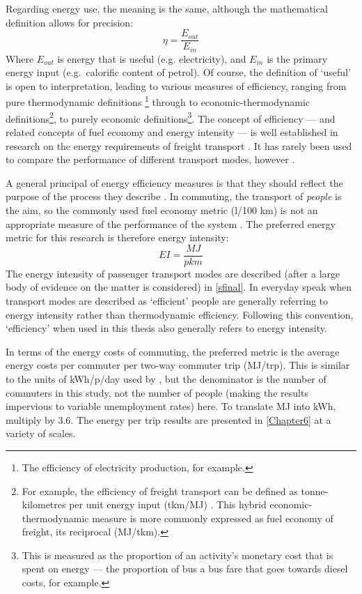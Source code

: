 \begin{itemize}
Regarding energy use, the meaning is the same, although the mathematical
definition allows for precision:
\begin{equation}
 \eta = \frac{E_{out}}{E_{in}}
\end{equation}
Where $E_{out}$ is energy that is useful (e.g. electricity), and $E_{in}$ is
the primary energy input (e.g.\ calorific content of petrol). Of course, the
definition of `useful' is open to interpretation\citep{Patterson1996}, leading
to various measures of efficiency, ranging from pure thermodynamic definitions
\footnote{The efficiency of electricity production, for example.}
through to
economic-thermodynamic definitions\footnote{For example, the efficiency of
freight transport can be defined as tonne-kilometres per unit energy input
(tkm/MJ) \citep{Simongati2010}. This hybrid economic-thermodynamic measure is
more commonly expressed as fuel economy of freight, its reciprocal
(MJ/tkm).},
to purely economic definitions\footnote{This is measured as the proportion of
an activity's monetary cost that is spent on energy --- the proportion of bus a
bus fare that goes towards diesel costs, for example.}. The concept of
efficiency --- and related concepts of fuel economy and energy
intensity --- is well established in research on the energy requirements
of freight transport \citep{Kamakate2009}. It has rarely been used to compare
the performance of different transport modes, however \citep{Fels1975,
Lovelace2011-assessing}.

A general principal of energy efficiency measures is that they should reflect
the purpose of the process they describe \citep{Patterson1996}. In commuting,
the transport of \emph{people} is the aim, so the commonly used fuel economy
metric (l/100 km) is not an appropriate measure of the  performance of the
system \citep{MacKay2009}. The preferred energy metric for this research is
therefore energy intensity:
\begin{equation}
 EI = \frac{MJ}{pkm}
\end{equation}
The energy intensity of passenger transport modes are described
(after a large body of evidence on the matter is considered) in \cref{sfinal}.
In everyday speak when transport modes are described as `efficient' people
are generally referring to energy intensity rather than thermodynamic
efficiency. Following this convention, `efficiency' when used in this thesis
also generally refers to energy intensity.

In terms of the energy costs of commuting, the preferred metric is the average
energy costs per commuter per two-way commuter trip (MJ/trp).
This is similar to the units of kWh/p/day used by \citet{Boussauw2009},
but the denominator is the number of commuters in this study, not the number
of people (making the results impervious to variable unemployment rates) here.
To translate MJ into kWh, multiply by 3.6.
The energy per trip results are presented in \cref{Chapter6} at a variety of scales.


\end{itemize}

